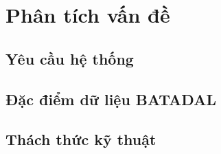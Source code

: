 \section{Phân tích vấn đề}

\subsection{Yêu cầu hệ thống}


\subsection{Đặc điểm dữ liệu BATADAL}


\subsection{Thách thức kỹ thuật}

